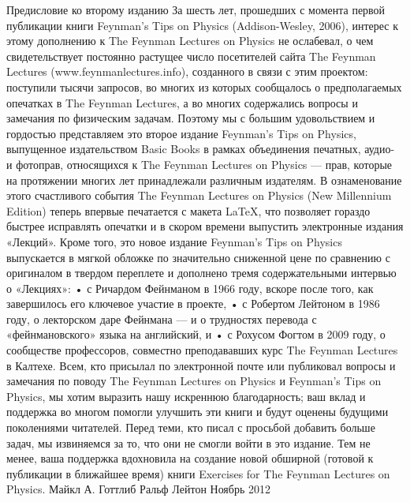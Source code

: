 \documentclass[11pt,oneside]{article}
\begin{document}

Предисловие ко второму изданию За шесть лет, прошедших с момента первой публикации книги Feynman’s Tips on Physics (Addison-Wesley, 2006), интерес к этому дополнению к The Feynman Lectures on Physics не ослабевал, о чем свидетельствует постоянно растущее число посетителей сайта The Feynman Lectures (www.feynmanlectures.info), созданного в связи с этим проектом: поступили тысячи запросов, во многих из которых сообщалось о предполагаемых опечатках в The Feynman Lectures, а во многих содержались вопросы и замечания по физическим задачам. Поэтому мы с большим удовольствием и гордостью представляем это второе издание Feynman’s Tips on Physics, выпущенное издательством Basic Books в рамках объединения печатных, аудио- и фотоправ, относящихся к The Feynman Lectures on Physics --- прав, которые на протяжении многих лет принадлежали различным издателям. В ознаменование этого счастливого события The Feynman Lectures on Physics (New Millennium Edition) теперь впервые печатается с макета LaTeX, что позволяет гораздо быстрее исправлять опечатки и в скором времени выпустить электронные издания «Лекций». Кроме того, это новое издание Feynman’s Tips on Physics выпускается в мягкой обложке по значительно сниженной цене по сравнению с оригиналом в твердом переплете и дополнено тремя содержательными интервью о «Лекциях»: • с Ричардом Фейнманом в 1966 году, вскоре после того, как завершилось его ключевое участие в проекте, • с Робертом Лейтоном в 1986 году, о лекторском даре Фейнмана --- и о трудностях перевода с «фейнмановского» языка на английский, и • с Рохусом Фогтом в 2009 году, о сообществе профессоров, совместно преподававших курс The Feynman Lectures в Калтехе. Всем, кто присылал по электронной почте или публиковал вопросы и замечания по поводу The Feynman Lectures on Physics и Feynman’s Tips on Physics, мы хотим выразить нашу искреннюю благодарность; ваш вклад и поддержка во многом помогли улучшить эти книги и будут оценены будущими поколениями читателей. Перед теми, кто писал с просьбой добавить больше задач, мы извиняемся за то, что они не смогли войти в это издание. Тем не менее, ваша поддержка вдохновила на создание новой обширной (готовой к публикации в ближайшее время) книги Exercises for The Feynman Lectures on Physics. Майкл А. Готтлиб Ральф Лейтон Ноябрь 2012\par



\clearpage

\end{document}
